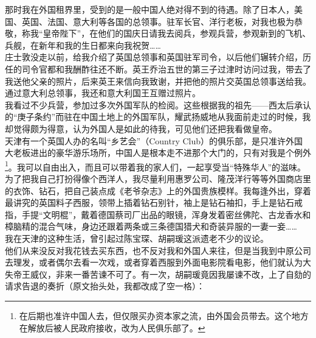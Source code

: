 那时我在外国租界里，受到的是一般中国人绝对得不到的待遇。除了日本人，美国、英国、法国、意大利等各国的总领事。驻军长官、洋行老板，对我也极为恭敬，称我“皇帝陛下”，在他们的国庆日请我去阅兵，参观兵营，参观新到的飞机、兵舰，在新年和我的生日都来向我祝贺……\\

庄士敦没走以前，给我介绍了英国总领事和英国驻军司令，以后他们辗转介绍，历任的司令官都和我酬酢往还不断。英王乔治五世的第三子过津时访问过我，带去了我送他父亲的照片，后来英王来信向我致谢，并把他的照片交英国总领事送给我。通过意大利总领事，我还和意大利国王互赠过照片。\\

我看过不少兵营，参加过多次外国军队的检阅。这些根据我的祖先——西太后承认的“庚子条约”而驻在中国土地上的外国军队，耀武扬威地从我面前走过的时候，我却觉得颇为得意，认为外国人是如此的待我，可见他们还把我看做皇帝。\\

天津有一个英国人办的名叫“乡艺会”（Country Club）的俱乐部，是只准许外国大老板进出的豪华游乐场所，中国人是根本走不进那个大门的，只有对我是个例外\footnote{在后期也准许中国人去，但仅限买办资本家之流，由外国会员带去。这个地方在解放后被人民政府接收，改为人民俱乐部了。}。我可以自由出入，而且可以带着我的家人们，一起享受当“特殊华人”的滋味。\\

为了把我自己打扮得像个西洋人，我尽量利用惠罗公司、隆茂洋行等等外国商店里的衣饰、钻石，把自己装点成《老爷杂志》上的外国贵族模样。我每逢外出，穿着最讲究的英国料子西服，领带上插着钻石别针，袖上是钻石袖扣，手上是钻石戒指，手提“文明棍”，戴着德国蔡司厂出品的眼镜，浑身发着密丝佛陀、古龙香水和樟脑精的混合气味，身边还跟着两条或三条德国猎犬和奇装异服的一妻一妾……\\

我在天津的这种生活，曾引起过陈宝琛、胡嗣瑗这派遗老不少的议论。\\

他们从来没反对我花钱去买东西，也不反对我和外国人来往，但是当我到中原公司去理发，或者偶尔去看一次戏，或者穿着西服到外面电影院看电影，他们就认为大失帝王威仪，非来一番苦谏不可了。有一次，胡嗣瑗竟因我屡谏不改，上了自劾的请求告退的奏折（原文抬头处，我都改成了空一格）：\\

